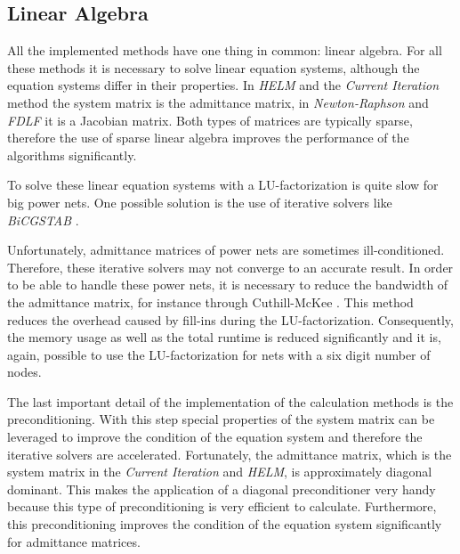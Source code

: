 \subsection{Linear Algebra}
All the implemented methods have one thing in common: linear algebra. For all these methods it is necessary to solve linear equation systems, although the equation systems differ in their properties. In \emph{HELM} and the \emph{Current Iteration} method the system matrix is the admittance matrix, in \emph{Newton-Raphson} and \emph{FDLF} it is a Jacobian matrix. Both types of matrices are typically sparse, therefore the use of sparse linear algebra improves the performance of the algorithms significantly.

To solve these linear equation systems with a LU-factorization is quite slow for big power nets. One possible  solution is the use of iterative solvers like \emph{BiCGSTAB} \cite{bicgstab}.

Unfortunately, admittance matrices of power nets are sometimes ill-conditioned. Therefore, these iterative solvers may not converge to an accurate result. In order to be able to handle these power nets, it is necessary to reduce the bandwidth of the admittance matrix, for instance through Cuthill-McKee \cite{cuthill}. This method reduces the overhead caused by fill-ins during the LU-factorization. Consequently, the memory usage as well as the total runtime is reduced significantly and it is, again, possible to use the LU-factorization for nets with a six digit number of nodes.

The last important detail of the implementation of the calculation methods is the preconditioning. With this step special properties of the system matrix can be leveraged to improve the condition of the equation system and therefore the iterative solvers are accelerated. Fortunately, the admittance matrix, which is the system matrix in the \emph{Current Iteration} and \emph{HELM}, is approximately diagonal dominant. This makes the application of a diagonal preconditioner very handy because this type of preconditioning is very efficient to calculate. Furthermore, this preconditioning improves the condition of the equation system significantly for admittance matrices.

